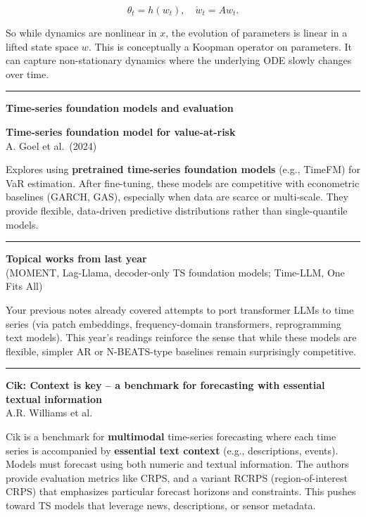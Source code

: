 \documentclass[a5paper]{article}
\def\subsection#1{{\par\bigskip\goodbreak\large\bfseries #1\par}}
\begin{document}
\[ \theta_t = h(w_t),\quad \dot w_t = A w_t. \]

So while dynamics are nonlinear in $x$, the evolution of parameters is
linear in a lifted state space $w$. This is conceptually a Koopman
operator on parameters. It can capture non-stationary dynamics where the
underlying ODE slowly changes over time.

\begin{center}\rule{0.5\linewidth}{0.5pt}\end{center}

\subsection{Time-series foundation models and
evaluation}\label{time-series-foundation-models-and-evaluation}

\textbf{Time-series foundation model for value-at-risk}\\
A. Goel et al.~(2024)

Explores using \textbf{pretrained time-series foundation models} (e.g.,
TimeFM) for VaR estimation. After fine-tuning, these models are
competitive with econometric baselines (GARCH, GAS), especially when
data are scarce or multi-scale. They provide flexible, data-driven
predictive distributions rather than single-quantile models.

\begin{center}\rule{0.5\linewidth}{0.5pt}\end{center}

\textbf{Topical works from last year}\\
(MOMENT, Lag-Llama, decoder-only TS foundation models; Time-LLM, One
Fits All)

Your previous notes already covered attempts to port transformer LLMs to
time series (via patch embeddings, frequency-domain transformers,
reprogramming text models). This year's readings reinforce the sense
that while these models are flexible, simpler AR or N-BEATS-type
baselines remain surprisingly competitive.

\begin{center}\rule{0.5\linewidth}{0.5pt}\end{center}

\textbf{Cik: Context is key -- a benchmark for forecasting with
essential textual information}\\
A.R. Williams et al.

Cik is a benchmark for \textbf{multimodal} time-series forecasting where
each time series is accompanied by \textbf{essential text context}
(e.g., descriptions, events). Models must forecast using both numeric
and textual information. The authors provide evaluation metrics like
CRPS, and a variant RCRPS (region-of-interest CRPS) that emphasizes
particular forecast horizons and constraints. This pushes toward TS
models that leverage news, descriptions, or sensor metadata.
\end{document}
